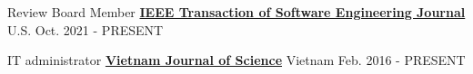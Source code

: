 

\begin{cventries}
	\cventry
	{Review Board Member} %
	{\href{http://www.nec-labs.com/}{\bf IEEE Transaction of Software Engineering Journal}}  %
	{U.S.} %
	{Oct. 2021 - PRESENT} %
	{
		\begin{cvitems} %
		\end{cvitems}
	}
	
	\vspace{-5mm}
	\cventry
	{IT administrator}%
	{\href{http://www.bloomberg.com/}{\bf Vietnam Journal of Science}}  %
	{Vietnam} %
	{Feb. 2016 - PRESENT} %
	{
		\begin{cvitems} %
		\end{cvitems}
	}
	


\end{cventries}